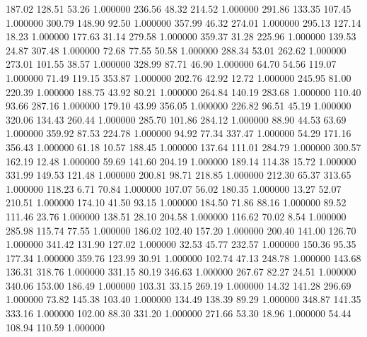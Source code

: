     187.02    128.51     53.26  1.000000
    236.56     48.32    214.52  1.000000
    291.86    133.35    107.45  1.000000
    300.79    148.90     92.50  1.000000
    357.99     46.32    274.01  1.000000
    295.13    127.14     18.23  1.000000
    177.63     31.14    279.58  1.000000
    359.37     31.28    225.96  1.000000
    139.53     24.87    307.48  1.000000
     72.68     77.55     50.58  1.000000
    288.34     53.01    262.62  1.000000
    273.01    101.55     38.57  1.000000
    328.99     87.71     46.90  1.000000
     64.70     54.56    119.07  1.000000
     71.49    119.15    353.87  1.000000
    202.76     42.92     12.72  1.000000
    245.95     81.00    220.39  1.000000
    188.75     43.92     80.21  1.000000
    264.84    140.19    283.68  1.000000
    110.40     93.66    287.16  1.000000
    179.10     43.99    356.05  1.000000
    226.82     96.51     45.19  1.000000
    320.06    134.43    260.44  1.000000
    285.70    101.86    284.12  1.000000
     88.90     44.53     63.69  1.000000
    359.92     87.53    224.78  1.000000
     94.92     77.34    337.47  1.000000
     54.29    171.16    356.43  1.000000
     61.18     10.57    188.45  1.000000
    137.64    111.01    284.79  1.000000
    300.57    162.19     12.48  1.000000
     59.69    141.60    204.19  1.000000
    189.14    114.38     15.72  1.000000
    331.99    149.53    121.48  1.000000
    200.81     98.71    218.85  1.000000
    212.30     65.37    313.65  1.000000
    118.23      6.71     70.84  1.000000
    107.07     56.02    180.35  1.000000
     13.27     52.07    210.51  1.000000
    174.10     41.50     93.15  1.000000
    184.50     71.86     88.16  1.000000
     89.52    111.46     23.76  1.000000
    138.51     28.10    204.58  1.000000
    116.62     70.02      8.54  1.000000
    285.98    115.74     77.55  1.000000
    186.02    102.40    157.20  1.000000
    200.40    141.00    126.70  1.000000
    341.42    131.90    127.02  1.000000
     32.53     45.77    232.57  1.000000
    150.36     95.35    177.34  1.000000
    359.76    123.99     30.91  1.000000
    102.74     47.13    248.78  1.000000
    143.68    136.31    318.76  1.000000
    331.15     80.19    346.63  1.000000
    267.67     82.27     24.51  1.000000
    340.06    153.00    186.49  1.000000
    103.31     33.15    269.19  1.000000
     14.32    141.28    296.69  1.000000
     73.82    145.38    103.40  1.000000
    134.49    138.39     89.29  1.000000
    348.87    141.35    333.16  1.000000
    102.00     88.30    331.20  1.000000
    271.66     53.30     18.96  1.000000
     54.44    108.94    110.59  1.000000
